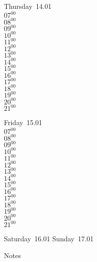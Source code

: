 \documentclass[11pt,a4paper]{book}\usepackage[]{graphicx}\usepackage[]{color}
\begin{document}
\clearpage
\begin{headerbox}
\end{headerbox}
\begin{weekdaybox}
  Thursday~14.01\\
  { 
  \vfill
  $07^{00}$\\
$08^{00}$\\
$09^{00}$\\
$10^{00}$\\
$11^{00}$\\
$12^{00}$\\
$13^{00}$\\
$14^{00}$\\
$15^{00}$\\
$16^{00}$\\
$17^{00}$\\
$18^{00}$\\
$19^{00}$\\
$20^{00}$\\
$21^{00}$\\
  }
\end{weekdaybox} 
\begin{weekdaybox}
  Friday~15.01\\
  { 
  \vfill
  $07^{00}$\\
$08^{00}$\\
$09^{00}$\\
$10^{00}$\\
$11^{00}$\\
$12^{00}$\\
$13^{00}$\\
$14^{00}$\\
$15^{00}$\\
$16^{00}$\\
$17^{00}$\\
$18^{00}$\\
$19^{00}$\\
$20^{00}$\\
$21^{00}$\\
  }
\end{weekdaybox}
\begin{weekendbox}
  Saturday~16.01
  \tcblower
  Sunday~17.01
\end{weekendbox} %
\begin{notebox}
  Notes
\end{notebox}
\clearpage
\end{document}
